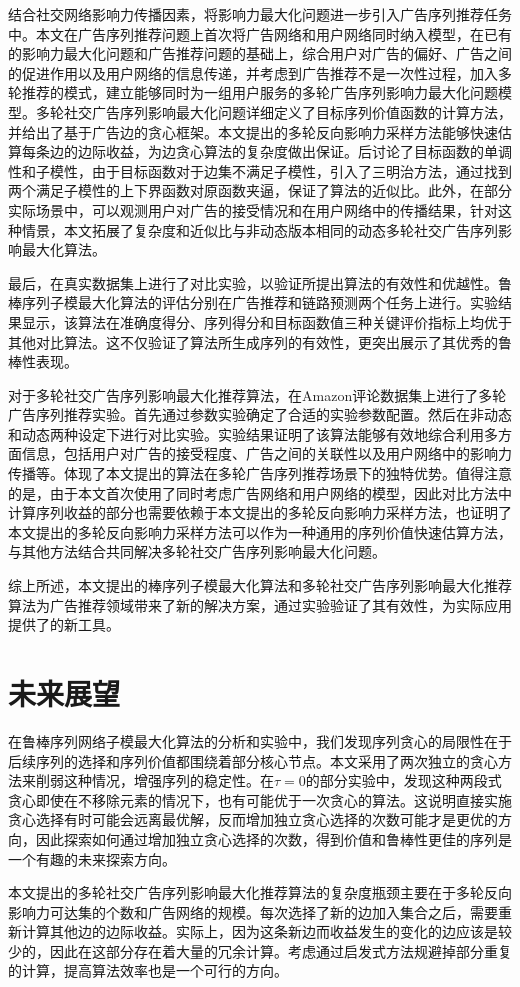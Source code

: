 结合社交网络影响力传播因素，将影响力最大化问题进一步引入广告序列推荐任务中。本文在广告序列推荐问题上首次将广告网络和用户网络同时纳入模型，在已有的影响力最大化问题和广告推荐问题的基础上，综合用户对广告的偏好、广告之间的促进作用以及用户网络的信息传递，并考虑到广告推荐不是一次性过程，加入多轮推荐的模式，建立能够同时为一组用户服务的多轮广告序列影响力最大化问题模型。多轮社交广告序列影响最大化问题详细定义了目标序列价值函数的计算方法，并给出了基于广告边的贪心框架。本文提出的多轮反向影响力采样方法能够快速估算每条边的边际收益，为边贪心算法的复杂度做出保证。后讨论了目标函数的单调性和子模性，由于目标函数对于边集不满足子模性，引入了三明治方法，通过找到两个满足子模性的上下界函数对原函数夹逼，保证了算法的近似比。此外，在部分实际场景中，可以观测用户对广告的接受情况和在用户网络中的传播结果，针对这种情景，本文拓展了复杂度和近似比与非动态版本相同的动态多轮社交广告序列影响最大化算法。

最后，在真实数据集上进行了对比实验，以验证所提出算法的有效性和优越性。鲁棒序列子模最大化算法的评估分别在广告推荐和链路预测两个任务上进行。实验结果显示，该算法在准确度得分、序列得分和目标函数值三种关键评价指标上均优于其他对比算法。这不仅验证了算法所生成序列的有效性，更突出展示了其优秀的鲁棒性表现。

对于多轮社交广告序列影响最大化推荐算法，在Amazon评论数据集上进行了多轮广告序列推荐实验。首先通过参数实验确定了合适的实验参数配置。然后在非动态和动态两种设定下进行对比实验。实验结果证明了该算法能够有效地综合利用多方面信息，包括用户对广告的接受程度、广告之间的关联性以及用户网络中的影响力传播等。体现了本文提出的算法在多轮广告序列推荐场景下的独特优势。值得注意的是，由于本文首次使用了同时考虑广告网络和用户网络的模型，因此对比方法中计算序列收益的部分也需要依赖于本文提出的多轮反向影响力采样方法，也证明了本文提出的多轮反向影响力采样方法可以作为一种通用的序列价值快速估算方法，与其他方法结合共同解决多轮社交广告序列影响最大化问题。

综上所述，本文提出的棒序列子模最大化算法和多轮社交广告序列影响最大化推荐算法为广告推荐领域带来了新的解决方案，通过实验验证了其有效性，为实际应用提供了的新工具。

\section{未来展望}

在鲁棒序列网络子模最大化算法的分析和实验中，我们发现序列贪心的局限性在于后续序列的选择和序列价值都围绕着部分核心节点。本文采用了两次独立的贪心方法来削弱这种情况，增强序列的稳定性。在$\tau=0$的部分实验中，发现这种两段式贪心即使在不移除元素的情况下，也有可能优于一次贪心的算法。这说明直接实施贪心选择有时可能会远离最优解，反而增加独立贪心选择的次数可能才是更优的方向，因此探索如何通过增加独立贪心选择的次数，得到价值和鲁棒性更佳的序列是一个有趣的未来探索方向。

本文提出的多轮社交广告序列影响最大化推荐算法的复杂度瓶颈主要在于多轮反向影响力可达集的个数和广告网络的规模。每次选择了新的边加入集合之后，需要重新计算其他边的边际收益。实际上，因为这条新边而收益发生的变化的边应该是较少的，因此在这部分存在着大量的冗余计算。考虑通过启发式方法规避掉部分重复的计算，提高算法效率也是一个可行的方向。